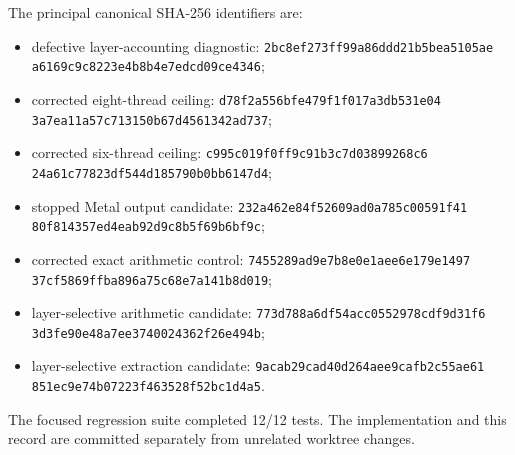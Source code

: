 The principal canonical SHA-256 identifiers are:
\begin{itemize}
  \item defective layer-accounting diagnostic:
  \texttt{2bc8ef273ff99a86ddd21b5bea5105ae}\\
  \texttt{a6169c9c8223e4b8b4e7edcd09ce4346};
  \item corrected eight-thread ceiling:
  \texttt{d78f2a556bfe479f1f017a3db531e04}\\
  \texttt{3a7ea11a57c713150b67d4561342ad737};
  \item corrected six-thread ceiling:
  \texttt{c995c019f0ff9c91b3c7d03899268c6}\\
  \texttt{24a61c77823df544d185790b0bb6147d4};
  \item stopped Metal output candidate:
  \texttt{232a462e84f52609ad0a785c00591f41}\\
  \texttt{80f814357ed4eab92d9c8b5f69b6bf9c};
  \item corrected exact arithmetic control:
  \texttt{7455289ad9e7b8e0e1aee6e179e1497}\\
  \texttt{37cf5869ffba896a75c68e7a141b8d019};
  \item layer-selective arithmetic candidate:
  \texttt{773d788a6df54acc0552978cdf9d31f6}\\
  \texttt{3d3fe90e48a7ee3740024362f26e494b};
  \item layer-selective extraction candidate:
  \texttt{9acab29cad40d264aee9cafb2c55ae61}\\
  \texttt{851ec9e74b07223f463528f52bc1d4a5}.
\end{itemize}

The focused regression suite completed 12/12 tests.  The implementation and
this record are committed separately from unrelated worktree changes.
